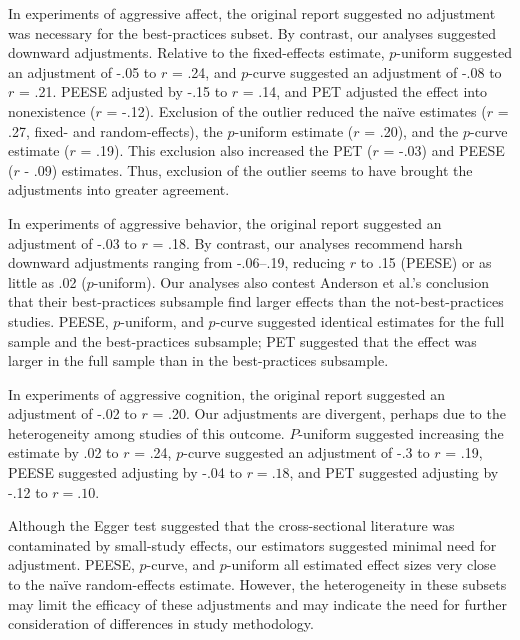 \documentclass[man, mask]{apa6}
\begin{document}
In experiments of aggressive affect, the original report suggested no adjustment was necessary for the best-practices subset. By contrast, our analyses suggested downward adjustments. Relative to the fixed-effects estimate, $p$-uniform suggested an adjustment of -.05 to $r$ = .24, and $p$-curve suggested an adjustment of -.08 to $r$ = .21. PEESE adjusted by -.15 to $r$ = .14, and PET adjusted the effect into nonexistence ($r$ = -.12). Exclusion of the outlier \citet{Ballard:Wiest:1996} reduced the na{\"i}ve estimates ($r$ = .27, fixed- and random-effects), the $p$-uniform estimate ($r$ = .20), and the $p$-curve estimate ($r$ = .19). This exclusion also increased the PET ($r$ = -.03) and PEESE ($r$ - .09) estimates. Thus, exclusion of the outlier seems to have brought the adjustments into greater agreement.

In experiments of aggressive behavior, the original report suggested an adjustment of -.03 to $r$ = .18. By contrast, our analyses recommend harsh downward adjustments ranging from -.06--.19, reducing $r$ to .15 (PEESE) or as little as .02 ($p$-uniform). Our analyses also contest Anderson et al.'s conclusion that their best-practices subsample find larger effects than the not-best-practices studies. PEESE, $p$-uniform, and $p$-curve suggested identical estimates for the full sample and the best-practices subsample; PET suggested that the effect was larger in the full sample than in the best-practices subsample. 

In experiments of aggressive cognition, the original report suggested an adjustment of -.02 to $r$ = .20. Our adjustments are divergent, perhaps due to the heterogeneity among studies of this outcome. $P$-uniform suggested increasing the estimate by .02 to $r$ = .24, $p$-curve suggested an adjustment of -.3 to $r$ = .19, PEESE suggested adjusting by -.04 to $r = .18$, and PET suggested adjusting by -.12 to $r = .10$.


Although the Egger test suggested that the cross-sectional literature was contaminated by small-study effects, our estimators suggested minimal need for adjustment. PEESE, $p$-curve, and $p$-uniform all estimated effect sizes very close to the na{\"i}ve random-effects estimate. However, the heterogeneity in these subsets may limit the efficacy of these adjustments and may indicate the need for further consideration of differences in study methodology.
\end{document}
